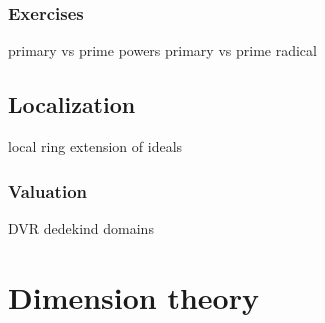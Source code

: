 \documentclass{../../large}
\begin{document}
\section*{Exercises}

primary vs prime powers
primary vs prime radical





\chapter{Localization}
local ring
extension of ideals

\section{Valuation}

DVR
dedekind domains





\part{Dimension theory}

\chapter{}

\begin{prb}
\end{prb}
\end{document}
